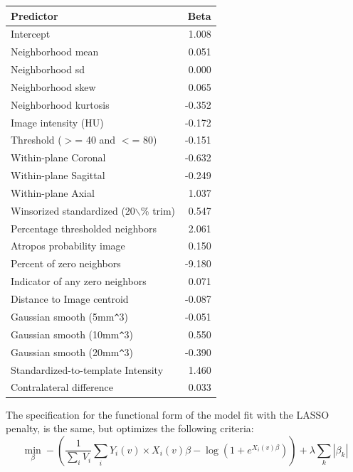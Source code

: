 \documentclass{elsarticle_nonatbib}\usepackage[]{graphicx}\usepackage[]{color}
\begin{document}
\begin{table}[ht]
\centering
\begin{tabular}{lr}
  \hline
Predictor & Beta \\ 
  \hline
Intercept & 1.008 \\ 
  Neighborhood mean & 0.051 \\ 
  Neighborhood sd & 0.000 \\ 
  Neighborhood skew & 0.065 \\ 
  Neighborhood kurtosis & -0.352 \\ 
  Image intensity (HU) & -0.172 \\ 
  Threshold ($>$= 40 and $<$= 80) & -0.151 \\ 
  Within-plane Coronal & -0.632 \\ 
  Within-plane Sagittal & -0.249 \\ 
  Within-plane Axial & 1.037 \\ 
  Winsorized standardized (20$\backslash$\% trim) & 0.547 \\ 
  Percentage thresholded neighbors & 2.061 \\ 
  Atropos probability image & 0.150 \\ 
  Percent of zero neighbors & -9.180 \\ 
  Indicator of any zero neighbors & 0.071 \\ 
  Distance to Image centroid & -0.087 \\ 
  Gaussian smooth (5mm\verb|^|3) & -0.051 \\ 
  Gaussian smooth (10mm\verb|^|3) & 0.550 \\ 
  Gaussian smooth (20mm\verb|^|3) & -0.390 \\ 
  Standardized-to-template Intensity & 1.460 \\ 
  Contralateral difference & 0.033 \\ 
   \hline
\end{tabular}
\end{table}


The specification for the functional form of the model fit with the LASSO penalty, is the same, but optimizes the following criteria:
$$
\min_{\beta} - \left( \frac{1}{\sum_{i}V_i} \sum_i Y_{i}(v) \times X_i(v)\beta - \log \left(1 + e^{X_i(v)\beta}\right) \right) +\lambda\sum_{k}\left|\beta_k\right|
$$
\end{document}
